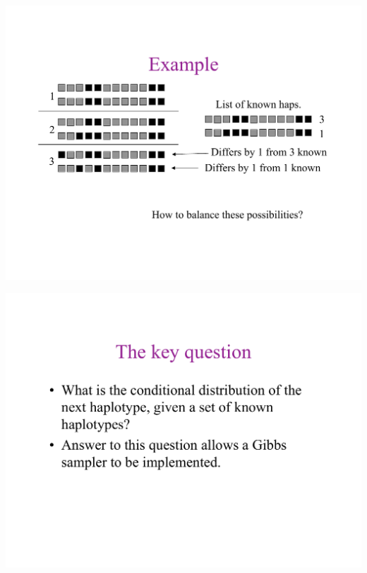 \newslide{}
\mbox{}
\vspace*{\VertUp}
\enlargethispage*{1000pt}
\begin{center}
\includegraphics*[width=\textwidth]{PPT_pages/pg_0035.pdf}
\end{center}


\newslide{}
\mbox{}
\vspace*{\VertUp}
\enlargethispage*{1000pt}
\begin{center}
\includegraphics*[width=\textwidth]{PPT_pages/pg_0036.pdf}
\end{center}


